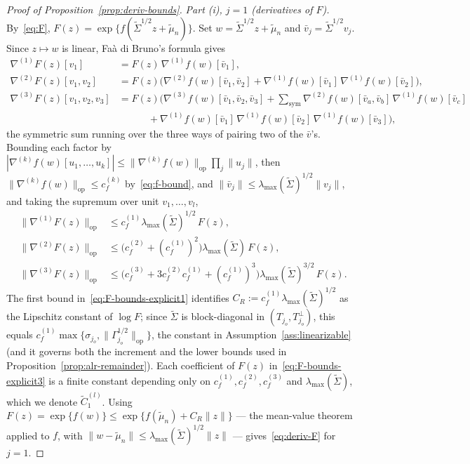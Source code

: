 \documentclass[12pt]{article}
\newcommand{\op}{\mathrm{op}}
\begin{document}
\begin{appendices}
\begin{proof}[Proof of Proposition~\ref{prop:deriv-bounds}]
\textit{Part (i), $j=1$ (derivatives of $F$).}
By~\eqref{eq:F}, $F(z)=\exp\{f(\widetilde\Sigma^{1/2}z+\widetilde\mu_n)\}$.
Set $w=\widetilde\Sigma^{1/2}z+\widetilde\mu_n$ and
$\bar v_j=\widetilde\Sigma^{1/2}v_j$. Since $z\mapsto w$ is linear,
Fa\`a di Bruno's formula gives
\begin{align*}
  \nabla^{(1)}F(z)[v_1]
  &=F(z)\,\nabla^{(1)}f(w)[\bar v_1],\\
  \nabla^{(2)}F(z)[v_1,v_2]
  &=F(z)\big(\nabla^{(2)}f(w)[\bar v_1,\bar v_2]
     +\nabla^{(1)}f(w)[\bar v_1]\,\nabla^{(1)}f(w)[\bar v_2]\big),\\
  \nabla^{(3)}F(z)[v_1,v_2,v_3]
  &=F(z)\big(\nabla^{(3)}f(w)[\bar v_1,\bar v_2,\bar v_3]
     +{\textstyle\sum_{\mathrm{sym}}}
       \nabla^{(2)}f(w)[\bar v_a,\bar v_b]\,\nabla^{(1)}f(w)[\bar v_c]\\
  &\qquad\quad
     +\nabla^{(1)}f(w)[\bar v_1]\,\nabla^{(1)}f(w)[\bar v_2]\,
       \nabla^{(1)}f(w)[\bar v_3]\big),
\end{align*}
the symmetric sum running over the three ways of pairing two of the
$\bar v$'s. Bounding each factor by
$|\nabla^{(k)}f(w)[u_1,\dots,u_k]|\le\|\nabla^{(k)}f(w)\|_{\op}
\prod_j\|u_j\|$, then $\|\nabla^{(k)}f(w)\|_{\op}\le c_f^{(k)}$
by~\eqref{eq:f-bound}, and
$\|\bar v_j\|\le\lambda_{\max}(\widetilde\Sigma)^{1/2}\|v_j\|$, and taking
the supremum over unit $v_1,\dots,v_l$,
\begin{align}
  \label{eq:F-bounds-explicit1}
  \|\nabla^{(1)}F(z)\|_{\op}
  &\le c_f^{(1)}\lambda_{\max}(\widetilde\Sigma)^{1/2}\,F(z),\\
  \|\nabla^{(2)}F(z)\|_{\op}
  &\le\big(c_f^{(2)}+(c_f^{(1)})^2\big)
     \lambda_{\max}(\widetilde\Sigma)\,F(z),\nonumber\\
  \|\nabla^{(3)}F(z)\|_{\op}
  &\label{eq:F-bounds-explicit3} \le\big(c_f^{(3)}+3c_f^{(2)}c_f^{(1)}+(c_f^{(1)})^3\big)
     \lambda_{\max}(\widetilde\Sigma)^{3/2}\,F(z).
\end{align}
The first bound in~\eqref{eq:F-bounds-explicit1}  identifies $C_R:=c_f^{(1)}\lambda_{\max}(\widetilde\Sigma)^{1/2}$ as the Lipschitz constant of $\log F$; since $\widetilde\Sigma$ is block-diagonal in $(T_{j_o},T_{j_o}^\perp)$, this equals $c_f^{(1)}\max\{\sigma_{j_o},\|\Gamma_{j_o}^{1/2}\|_{\op}\}$, the constant in Assumption~\ref{ass:linearizable} (and it governs both the increment and
the lower bounds used in Proposition~\ref{prop:alr-remainder}). Each
coefficient of $F(z)$ in~\eqref{eq:F-bounds-explicit3} is a finite
constant depending only on $c_f^{(1)},c_f^{(2)},c_f^{(3)}$ and
$\lambda_{\max}(\widetilde\Sigma)$, which we denote $\widetilde C_1^{(l)}$.
Using $F(z)=\exp\{f(w)\}\le\exp\{f(\widetilde\mu_n)+C_R\|z\|\}$ — the
mean-value theorem applied to $f$, with
$\|w-\widetilde\mu_n\|\le\lambda_{\max}(\widetilde\Sigma)^{1/2}\|z\|$ —
gives~\eqref{eq:deriv-F} for $j=1$.


\end{proof}
\end{appendices}
\end{document}
